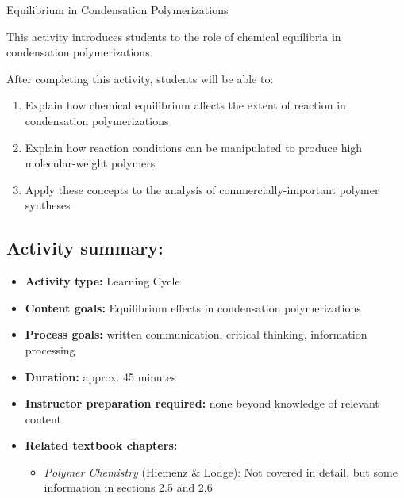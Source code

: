 %
%
%
%

\renewcommand{\figpath}{content/polymchem/stepgrowth/condensation-equilibria/figs}
\renewcommand{\labelbase}{condequilib}

\begin{activity}{Equilibrium in Condensation Polymerizations}

\begin{instructornotes}

	This activity introduces students to the role of chemical equilibria in condensation polymerizations.
	
	After completing this activity, students will be able to:
			\begin{enumerate}
				\item Explain how chemical equilibrium affects the extent of reaction in condensation polymerizations
				\item Explain how reaction conditions can be manipulated to produce high molecular-weight polymers
				\item Apply these concepts to the analysis of commercially-important polymer syntheses
			\end{enumerate}
	
			
	\subsection*{Activity summary:}
	\begin{itemize}
		\item \textbf{Activity type:} Learning Cycle
		\item \textbf{Content goals:} Equilibrium effects in condensation polymerizations
		\item \textbf{Process goals:} %
			written communication, critical thinking, information processing
		\item \textbf{Duration:} approx. 45 minutes
		\item \textbf{Instructor preparation required:} none beyond knowledge of relevant content
		\item \textbf{Related textbook chapters:}
			\begin{itemize}
				\item \emph{Polymer Chemistry} (Hiemenz \& Lodge): Not covered in detail, but some information in sections 2.5 and 2.6
			\end{itemize}
	\end{itemize}


\end{instructornotes}
\end{activity}
